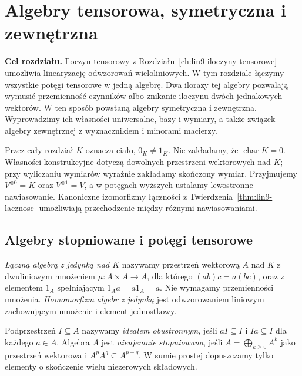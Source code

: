 \chapter{Algebry tensorowa, symetryczna i zewnętrzna}
\label{ch:lin10-algebry}

\noindent\textbf{Cel rozdziału.}
Iloczyn tensorowy z Rozdziału~\ref{ch:lin9-iloczyny-tensorowe}
umożliwia linearyzację odwzorowań wieloliniowych.
W tym rozdziale łączymy wszystkie potęgi tensorowe
w jedną algebrę. Dwa ilorazy tej algebry pozwalają
wymusić przemienność czynników albo znikanie iloczynu
dwóch jednakowych wektorów. W ten sposób powstaną
algebry symetryczna i zewnętrzna. Wyprowadzimy ich
własności uniwersalne, bazy i wymiary, a także
związek algebry zewnętrznej z wyznacznikiem
i minorami macierzy.

Przez cały rozdział \(K\) oznacza ciało, \(0_K\ne1_K\).
Nie zakładamy, że \(\operatorname{char}K=0\).
Własności konstrukcyjne dotyczą dowolnych przestrzeni
wektorowych nad \(K\); przy wyliczaniu wymiarów
wyraźnie zakładamy skończony wymiar. Przyjmujemy
\(V^{\otimes0}=K\) oraz \(V^{\otimes1}=V\), a w potęgach
wyższych ustalamy lewostronne nawiasowanie.
Kanoniczne izomorfizmy łączności z
Twierdzenia~\ref{thm:lin9-lacznosc} umożliwiają
przechodzenie między różnymi nawiasowaniami.

\section{Algebry stopniowane i potęgi tensorowe}
\label{sec:lin10-podstawy}

\begin{definicja}
\label{def:lin10-algebra}
\emph{Łączną algebrą z jedynką nad \(K\)}
nazywamy przestrzeń wektorową \(A\) nad \(K\)
z dwuliniowym mnożeniem
\(\mu\colon A\times A\to A\), dla którego
\((ab)c=a(bc)\), oraz z elementem \(1_A\)
spełniającym \(1_Aa=a1_A=a\).
Nie wymagamy przemienności mnożenia.
\emph{Homomorfizm algebr z jedynką}
jest odwzorowaniem liniowym zachowującym
mnożenie i element jednostkowy.

Podprzestrzeń \(I\subseteq A\)
nazywamy \emph{ideałem obustronnym},
jeśli \(aI\subseteq I\) i \(Ia\subseteq I\)
dla każdego \(a\in A\).
Algebra \(A\) jest \emph{nieujemnie stopniowana},
jeśli
\(A=\bigoplus_{k\geq0} A^k\) jako przestrzeń
wektorowa i \(A^pA^q\subseteq A^{p+q}\).
W sumie prostej dopuszczamy tylko elementy
o skończenie wielu niezerowych składowych.
\end{definicja}

